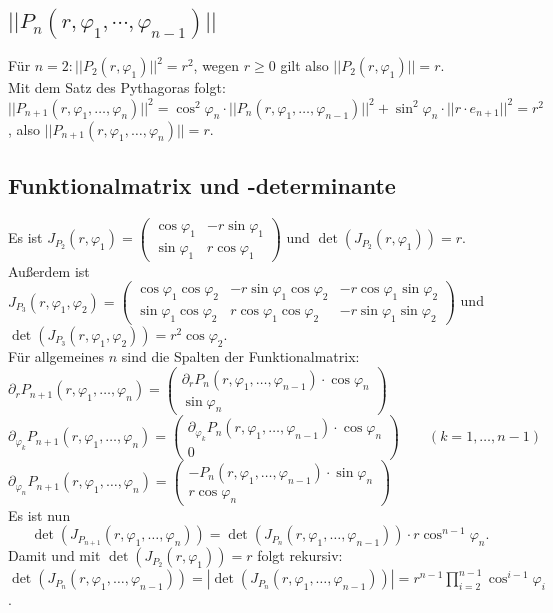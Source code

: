 \documentclass[a4paper,11pt]{scrartcl}
\begin{document}
\subsection{$||P_n(r,\varphi_1,\cdots,\varphi_{n-1})||$}
Für $n=2: ||P_2(r,\varphi_1)||^2=r^2$, wegen $r\geq 0$ gilt also $||P_2(r,\varphi_1)||=r$.\\
Mit dem Satz des Pythagoras folgt:\\
$||P_{n+1}(r,\varphi_1,\ldots,\varphi_n)||^2=\cos^2\varphi_n\cdot||P_n(r,\varphi_1,\ldots,\varphi_{n-1})||^2 +\sin^2\varphi_n\cdot||r\cdot e_{n+1}||^2=r^2$, also $||P_{n+1}(r,\varphi_1,\ldots,\varphi_n)||=r.$

\subsection{Funktionalmatrix und -determinante}
Es ist $J_{P_2}(r,\varphi_1)=\begin{pmatrix}\cos\varphi_1 & -r\sin\varphi_1 \\
\sin\varphi_1 & r\cos\varphi_1\end{pmatrix}$ und 
$\det (J_{P_2}(r,\varphi_1))=r.$\\
Außerdem ist $J_{P_3}(r, \varphi_1, \varphi_2 )=
\begin{pmatrix} \cos\varphi_1\cos\varphi_2 & -r\sin\varphi_1\cos\varphi_2 & -r\cos\varphi_1\sin\varphi_2 \\ 
\sin\varphi_1\cos\varphi_2 & r\cos\varphi_1\cos\varphi_2 & -r\sin\varphi_1\sin\varphi_2\end{pmatrix}$ und $\det(J_{P_3}(r, \varphi_1, \varphi_2 ))=r^2\cos\varphi_2.$\\
Für allgemeines $n$ sind die Spalten der Funktionalmatrix:\\
$ \partial_r P_{n+1}(r,\varphi_1,\ldots,\varphi_n)= \begin{pmatrix}\partial_r P_n(r,\varphi_1,\ldots,\varphi_{n-1})\cdot\cos\varphi_n \\ \sin\varphi_n \end{pmatrix} $\\[1em]
$ \partial_{\varphi_k}P_{n+1}(r,\varphi_1,\ldots,\varphi_n) = \begin{pmatrix}\partial_{\varphi_k} P_n(r,\varphi_1,\ldots,\varphi_{n-1})\cdot\cos\varphi_n \\ 0 \end{pmatrix} \qquad (k=1,\ldots,n-1)$\\[1em]
$ \partial_{\varphi_n}P_{n+1}(r,\varphi_1,\ldots,\varphi_n)= \begin{pmatrix}-P_n(r,\varphi_1,\ldots,\varphi_{n-1})\cdot\sin\varphi_n \\ r\cos\varphi_n \end{pmatrix} $\\[1em]
Es ist nun
\begin{equation*}
\label{det}\det(J_{P_{n+1}}(r,\varphi_1,\ldots,\varphi_n))=\det(J_{P_n}(r,\varphi_1,\ldots,\varphi_{n-1}))\cdot r\cos^{n-1}\varphi_n.
\end{equation*}
Damit und mit $\det(J_{P_2}(r, \varphi_1))=r$ folgt rekursiv:\\
$\det(J_{P_n}(r,\varphi_1,\ldots,\varphi_{n-1}))=|\det(J_{P_n}(r,\varphi_1,\ldots,\varphi_{n-1}))|=r^{n-1}\prod\limits_{i=2}^{n-1}\cos^{i-1}\varphi_i$.
\end{document}
